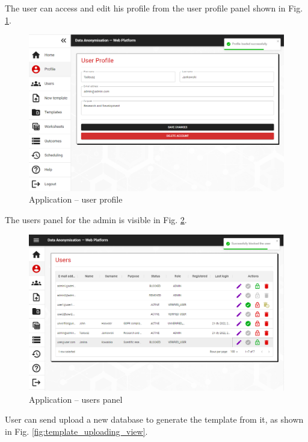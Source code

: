 \documentclass[a4paper,twoside,12pt]{book}
\begin{document}
The user can access and edit his profile from the user profile panel shown in Fig. \ref{fig:profile22}.

\begin{figure}
  \centering
  \includegraphics[width=\linewidth]{img/app_profile.png}
  \caption{Application -- user profile}
  \label{fig:profile22}
\end{figure}


The users panel for the admin is visible in Fig. \ref{fig:userspanell}.

\begin{figure}
  \centering
  \includegraphics[width=\linewidth]{img/app_users.png}
  \caption{Application -- users panel}
  \label{fig:userspanell}
\end{figure}


User can send upload a new database to generate the template from it, as shown in Fig. \ref{fig:template_uploading_view}.
\end{document}
